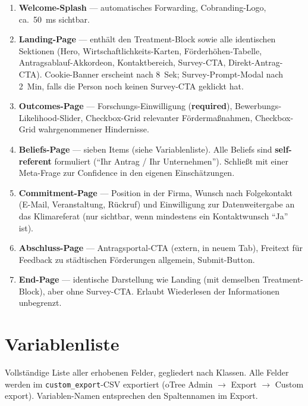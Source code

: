 \documentclass[11pt, a4paper]{scrartcl}
\newcommand{\var}[1]{\texttt{\small #1}}
\begin{document}
\begin{enumerate}[label=\textbf{\arabic*.}]
    \item \textbf{Welcome-Splash} --- automatisches Forwarding,
        Cobranding-Logo, ca.~50~ms sichtbar.
    \item \textbf{Landing-Page} --- enthält den Treatment-Block sowie alle
        identischen Sektionen (Hero, Wirtschaftlichkeits-Karten,
        Förderhöhen-Tabelle, Antragsablauf-Akkordeon, Kontaktbereich,
        Survey-CTA, Direkt-Antrag-CTA). Cookie-Banner erscheint nach 8~Sek;
        Survey-Prompt-Modal nach 2~Min, falls die Person noch keinen
        Survey-CTA geklickt hat.
    \item \textbf{Outcomes-Page} --- Forschungs-Einwilligung (\textbf{required}),
        Bewerbungs-Likelihood-Slider, Checkbox-Grid relevanter
        Fördermaßnahmen, Checkbox-Grid wahrgenommener Hindernisse.
    \item \textbf{Beliefs-Page} --- sieben Items (siehe Variablenliste).
        Alle Beliefs sind \textbf{self-referent} formuliert (\enquote{Ihr
        Antrag / Ihr Unternehmen}). Schließt mit einer Meta-Frage zur
        Confidence in den eigenen Einschätzungen.
    \item \textbf{Commitment-Page} --- Position in der Firma, Wunsch nach
        Folgekontakt (E-Mail, Veranstaltung, Rückruf) und Einwilligung zur
        Datenweitergabe an das Klimareferat (nur sichtbar, wenn
        mindestens ein Kontaktwunsch \enquote{Ja} ist).
    \item \textbf{Abschluss-Page} --- Antragsportal-CTA (extern, in neuem
        Tab), Freitext für Feedback zu städtischen Förderungen allgemein,
        Submit-Button.
    \item \textbf{End-Page} --- identische Darstellung wie Landing
        (mit demselben Treatment-Block), aber ohne Survey-CTA. Erlaubt
        Wiederlesen der Informationen unbegrenzt.
\end{enumerate}

\section{Variablenliste}

Vollständige Liste aller erhobenen Felder, gegliedert nach Klassen.
Alle Felder werden im \var{custom\_export}-CSV exportiert (oTree Admin
\(\rightarrow\) Export \(\rightarrow\) Custom export). Variablen-Namen
entsprechen den Spaltennamen im Export.
\end{document}
